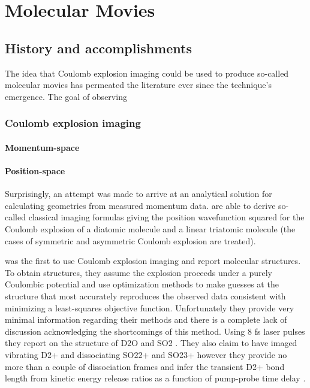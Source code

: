 \chapter{Molecular Movies}\label{ch:MolecularMovies}

\section{History and accomplishments}
The idea that Coulomb explosion imaging could be used to produce so-called molecular movies has permeated the literature ever since the technique's emergence. The goal of observing 

\subsection{Coulomb explosion imaging}

\subsubsection{Momentum-space}

\subsubsection{Position-space}
Surprisingly, an attempt was made to arrive at an analytical solution for calculating geometries from measured momentum data. \citet{Nagaya04}  are able to derive so-called classical imaging formulas giving the position wavefunction squared for the Coulomb explosion of a diatomic molecule and a linear triatomic molecule (the cases of symmetric and asymmetric Coulomb explosion are treated).

\citet{Legare05structure,Legare05dynamics} was the first to use Coulomb explosion imaging and report molecular structures. To obtain structures, they assume the explosion proceeds under a purely Coulombic potential and use optimization methods to make guesses at the structure that most accurately reproduces the observed data consistent with minimizing a least-squares objective function. Unfortunately they provide very minimal information regarding their methods and there is a complete lack of discussion acknowledging the shortcomings of this method. Using 8 fs laser pulses they report on the structure of D2O and SO2 \citep{Legare05structure}. They also claim to have imaged vibrating D2+ and dissociating SO22+ and SO23+ however they provide no more than a couple of dissociation frames and infer the transient D2+ bond length from kinetic energy release ratios as a function of pump-probe time delay \citep{Legare05dynamics}.

